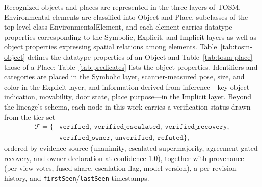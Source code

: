 Recognized objects and places are represented in the three layers of TOSM.
Environmental elements are classified into Object and Place, subclasses of the
top-level class EnvironmentalElement, and each element carries datatype
properties corresponding to the Symbolic, Explicit, and Implicit layers as well
as object properties expressing spatial relations among elements.
Table~\ref{tab:tosm-object} defines the datatype properties of an Object and
Table~\ref{tab:tosm-place} those of a Place; Table~\ref{tab:predicates} lists
the object properties. Identifiers and categories are placed in the Symbolic
layer, scanner-measured pose, size, and color in the Explicit layer, and
information derived from inference---key-object indication, movability, door
state, place purpose---in the Implicit layer. Beyond the lineage's schema, each
node in this work carries a verification status drawn from the tier set
\begin{equation}
\begin{aligned}
\mathcal{T}=\{&\texttt{verified},\ \texttt{verified\_escalated},\ \texttt{verified\_recovery},\\
&\texttt{verified\_owner},\ \texttt{unverified},\ \texttt{refuted}\},
\end{aligned}
\label{eq:tiers}
\end{equation}
ordered by evidence source (unanimity, escalated supermajority,
agreement-gated recovery, and owner declaration at confidence 1.0), together
with provenance (per-view votes, fused share, escalation flag, model version),
a per-revision history, and \texttt{firstSeen}/\texttt{lastSeen} timestamps.

